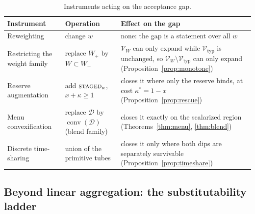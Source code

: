 \documentclass[preprint,11pt,authoryear]{elsarticle}
\theoremstyle{definition}
\theoremstyle{remark}
\newcommand{\Vtyp}{\mathcal{V}_{\mathrm{typ}}}
\newcommand{\Wp}{W_+}
\newcommand{\conv}{\operatorname{conv}}
\newcommand{\act}[1]{\textsc{#1}}
\begin{document}
\begin{table}[!htbp]
\centering\small
\caption{Instruments acting on the acceptance gap.}
\label{tab:instruments}
\begin{tabularx}{\textwidth}{@{}>{\raggedright\arraybackslash}p{}>{\raggedright\arraybackslash}p{}X@{}}
\toprule
Instrument & Operation & Effect on the gap \\
\midrule
Reweighting & change $w$ & none: the gap is a statement over all $w$ \\
Restricting the weight family & replace $\Wp$ by $W\subset\Wp$ & $\mathcal V_W$ can only expand while $\Vtyp$ is unchanged, so $\mathcal V_W\setminus\Vtyp$ can only expand (Proposition~\ref{prop:monotone}) \\
Reserve augmentation & add $\act{staged}_\kappa$, $x+\kappa\ge1$ & closes it where only the reserve binds, at cost $\kappa^*=1-x$ (Proposition~\ref{prop:rescue}) \\
Menu convexification & replace $\mathcal D$ by $\conv(\mathcal D)$ (blend family) & closes it exactly on the scalarized region (Theorems~\ref{thm:menu}, \ref{thm:blend}) \\
Discrete time-sharing & union of the primitive tubes & closes it only where both dips are separately survivable (Proposition~\ref{prop:timeshare}) \\
\bottomrule
\end{tabularx}
\end{table}

\subsection{Beyond linear aggregation: the substitutability ladder}\label{sec:ladder}
\end{document}
